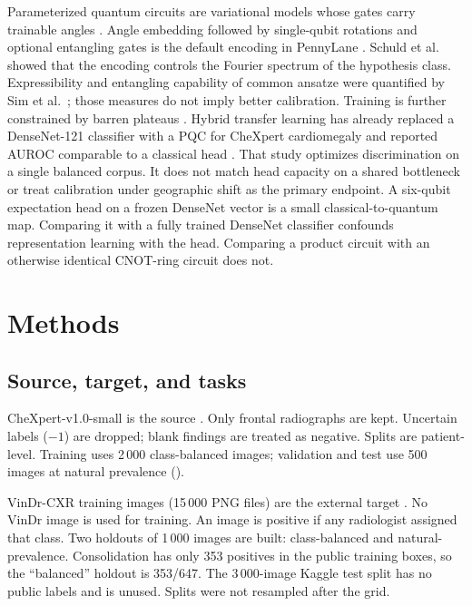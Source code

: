 \documentclass{midl} %
\begin{document}
Parameterized quantum circuits are variational models whose gates carry trainable angles \cite{mitarai2018qcl,benedetti2019pqc,cerezo2021vqa}. Angle embedding followed by single-qubit rotations and optional entangling gates is the default encoding in PennyLane \cite{bergholm2018pennylane}. Schuld et al.\ \cite{schuld2021encoding} showed that the encoding controls the Fourier spectrum of the hypothesis class. Expressibility and entangling capability of common ansatze were quantified by Sim et al.\ \cite{sim2019expressibility}; those measures do not imply better calibration. Training is further constrained by barren plateaus \cite{mcclean2018barren}. Hybrid transfer learning has already replaced a DenseNet-121 classifier with a PQC for CheXpert cardiomegaly and reported AUROC comparable to a classical head \cite{decoodt2023hybrid}. That study optimizes discrimination on a single balanced corpus. It does not match head capacity on a shared bottleneck or treat calibration under geographic shift as the primary endpoint. A six-qubit expectation head on a frozen DenseNet vector is a small classical-to-quantum map. Comparing it with a fully trained DenseNet classifier confounds representation learning with the head. Comparing a product circuit with an otherwise identical CNOT-ring circuit does not.

\section{Methods}

\subsection{Source, target, and tasks}

CheXpert-v1.0-small is the source \cite{irvin2019chexpert}. Only frontal radiographs are kept. Uncertain labels ($-1$) are dropped; blank findings are treated as negative. Splits are patient-level. Training uses 2\,000 class-balanced images; validation and test use 500 images at natural prevalence ().

VinDr-CXR training images (15\,000 PNG files) are the external target \cite{nguyen2022vindrcxr}. No VinDr image is used for training. An image is positive if any radiologist assigned that class. Two holdouts of 1\,000 images are built: class-balanced and natural-prevalence. Consolidation has only 353 positives in the public training boxes, so the ``balanced'' holdout is 353/647. The 3\,000-image Kaggle test split has no public labels and is unused. Splits were not resampled after the grid.
\end{document}
